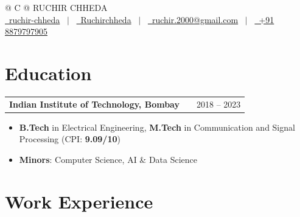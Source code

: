\documentclass[a4paper,10pt]{article}
\makeatletter
\newenvironment{joblong}[2]
    {
    \begin{tabularx}{\linewidth}{@{}l X r@{}}
    \textbf{#1} & \hfill &  #2 \\[3.75pt]
    \end{tabularx}
    \begin{minipage}[t]{\linewidth}
    \begin{itemize}[nosep,after=\strut, leftmargin=1em, itemsep=3pt,label=--]
    }
    {
    \end{itemize}
    \end{minipage}
    }
\makeatother
\begin{document}
\pagestyle{empty}



\begin{tabularx}{\linewidth}{@{} C @{}}
{\color{darkteal}\Huge{RUCHIR CHHEDA}} \\[7.5pt]
\vspace{5 pt}
\href{https://linkedin.com/in/ruchir-chheda-a71358186}{\raisebox{-0.05\height}\faLinkedin\ ruchir-chheda} \ $|$ \
\href{https://github.com/Ruchirchheda}{\raisebox{-0.05\height}\faGithub\ Ruchirchheda} \ $|$ \
\href{mailto:ruchir.2000@gmail.com}{\raisebox{-0.05\height}\faEnvelope \ ruchir.2000@gmail.com} \ $|$ \
\href{tel:+918879797905}{\raisebox{-0.05\height}\faMobile \ +91 8879797905} \\
\end{tabularx}


\section{Education}

\begin{joblong}{Indian Institute of Technology, Bombay}{2018 -- 2023}
\item \textbf{B.Tech} in Electrical Engineering, \textbf{M.Tech} in Communication and Signal Processing \hfill (CPI: \textbf{9.09/10})
\item \textbf{Minors}: Computer Science, AI \& Data Science
\end{joblong}


\section{Work Experience}
\end{document}
